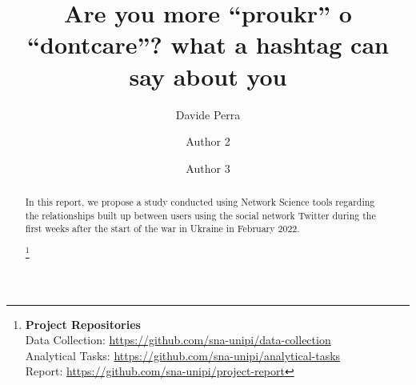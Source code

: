 \documentclass[sigchi]{acmart}
\begin{document}
%
\title{Are you more “proukr” o “dontcare”? 
what a hashtag can say about you}

%
\author{Davide Perra}

\author{Author 2}

\author{Author 3}


\renewcommand{\shortauthors}{One and Two, et al.}


\begin{abstract}
In this report, we propose a study conducted using Network Science tools regarding the relationships built up between users using the social network Twitter during the first weeks after the start of the war in Ukraine in February 2022.

\footnote{
{\bf Project Repositories}\\
\noindent Data Collection: \url{https://github.com/sna-unipi/data-collection}\\
\noindent Analytical Tasks: \url{https://github.com/sna-unipi/analytical-tasks}\\
\noindent Report: \url{https://github.com/sna-unipi/project-report}}
\end{abstract}


%


%
\maketitle
\end{document}

